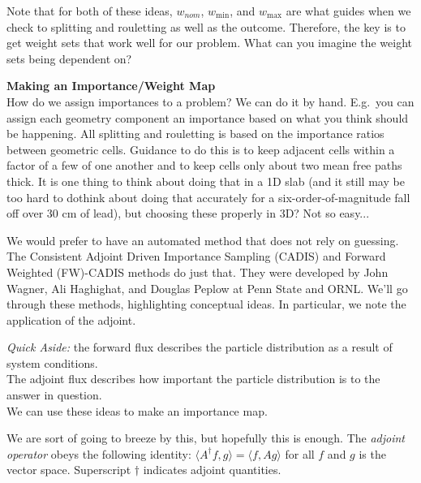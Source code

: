 \documentclass[12pt]{article}
\begin{document}
Note that for both of these ideas, $w_{nom}$, $w_{\min}$, and $w_{\max}$ are what guides when we check to splitting and rouletting as well as the outcome. Therefore, the key is to get weight sets that work well for our problem.
What can you imagine the weight sets being dependent on?

\textbf{Making an Importance/Weight Map}\\
How do we assign importances to a problem? We can do it by hand. E.g.\ you can assign each geometry component an importance based on what you think should be happening. All splitting and rouletting is based on the importance ratios between geometric cells. Guidance to do this is to keep adjacent cells within a factor of a few of one another and to keep cells only about two mean free paths thick. It is one thing to think about doing that in a 1D slab (and it still may be too hard to do\textemdash think about doing that accurately for a six-order-of-magnitude fall off over 30 cm of lead), but choosing these properly in 3D? Not so easy...

We would prefer to have an automated method that does not rely on guessing. The Consistent Adjoint Driven Importance Sampling (CADIS) and Forward Weighted (FW)-CADIS methods do just that. They were developed by John Wagner, Ali Haghighat, and Douglas Peplow at Penn State and ORNL. We'll go through these methods, highlighting conceptual ideas. In particular, we note the application of the adjoint.   

\textit{Quick Aside:} the forward flux describes the particle distribution as a result of system conditions. \\
The adjoint flux describes how important the particle distribution is to the answer in question. \\
We can use these ideas to make an importance map.

We are sort of going to breeze by this, but hopefully this is enough. The \textit{adjoint operator} obeys the following identity: $\langle A^{\dagger}f, g\rangle = \langle f, Ag\rangle$ for all $f$ and $g$ is the vector space. Superscript $\dagger$ indicates adjoint quantities.\\
\end{document}

